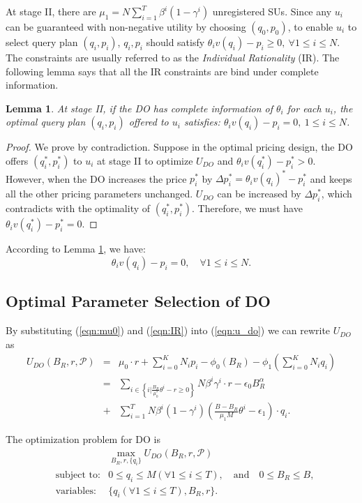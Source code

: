 \documentclass[journal]{IEEEtran}
\newtheorem{lemma}[theorem]{Lemma}
\begin{document}
At stage II, there are $\mu_1=N\sum_{i=1}^T\beta^i(1-\gamma^i)$ unregistered SUs. Since any $u_i$ can be guaranteed with non-negative utility by choosing $(q_0, p_0)$, to enable $u_i$ to select query plan $(q_i, p_i)$, $q_i, p_i$ should satisfy $\theta_iv(q_i)-p_i\geq 0, \ \forall 1\leq i\leq N$.
The constraints are usually referred to as the \emph{Individual Rationality} (IR).
The following lemma says that all the IR constraints are bind under complete information.
\begin{lemma}
\label{lemma:IR_complete}
At stage II, if the DO has complete information of $\theta_i$ for each $u_i$, the optimal query plan $(q_i, p_i)$ offered to $u_i$ satisfies: $\theta_iv(q_i)-p_i=0, \ 1\leq i\leq N$.
\end{lemma}
\begin{proof}
We prove by contradiction. Suppose in the optimal pricing design, the DO offers $(q_i^*, p_i^*)$ to $u_i$ at stage II to optimize $U_{DO}$ and $\theta_iv(q_i^*)-p_i^*>0$. However, when the DO increases the price $p_i^*$ by $\Delta p_i^*=\theta_iv(q_i)^*-p_i^*$ and keeps all the other pricing parameters unchanged. $U_{DO}$ can be increased by $\Delta p_i^*$, which contradicts with the optimality of $(q_i^*, p_i^*)$. Therefore, we must have $\theta_iv(q_i^*)-p_i^*=0$.
\end{proof}
According to Lemma \ref{lemma:IR_complete}, we have:
\begin{equation}
\label{eqn:IR}
\theta_iv(q_i)-p_i = 0, \quad \forall 1\leq i\leq N.
\end{equation}

\subsection{Optimal Parameter Selection of DO}

By substituting (\ref{eqn:mu0}) and (\ref{eqn:IR}) into (\ref{eqn:u_do}) we can rewrite $U_{DO}$ as
\begin{eqnarray}
  \label{eqn:UDO0}
U_{DO}(B_R, r, \mathcal{P})&=&\mu_0\cdot r + \sum_{i=0}^KN_ip_i-\phi_0(B_R)-\phi_1(\sum_{i=0}^KN_iq_i) \nonumber \\
&=&\sum_{i\in\left\{i|\frac{B_R}{\mu_0^*}\theta^i-r\geq 0\right\}}N\beta^i\gamma^i\cdot r - \epsilon_0B_R^{\alpha} \nonumber\\
&+&\sum_{i=1}^TN\beta^i\left(1-\gamma^i\right)\left(\frac{B-B_R}{\mu_1M}\theta^i-\epsilon_1\right)\cdot q_i.
\end{eqnarray}

The optimization problem for DO is
\begin{eqnarray}
\label{eqn:max_udo0}
&&\max_{B_R, r, \{q_i\}} U_{DO}(B_R, r, \mathcal{P}) \nonumber\\
&\textrm{subject to:} & 0\leq q_i\leq M (\forall 1\leq i\leq T), \quad\textrm{and}\quad 0\leq B_R\leq B, \nonumber\\
&\textrm{variables:} & \{q_i(\forall 1\leq i\leq T), B_R, r\}.
\end{eqnarray}
\end{document}
